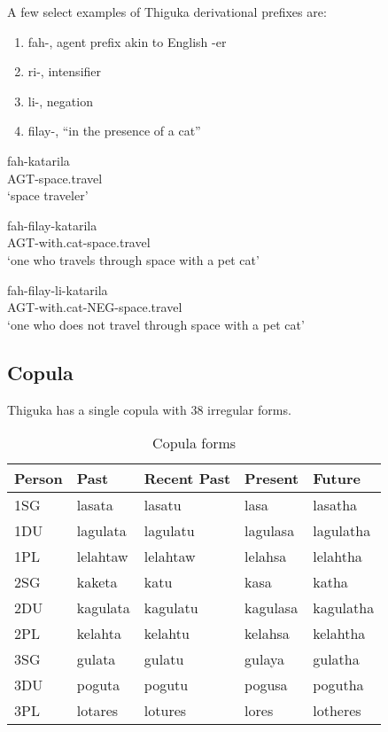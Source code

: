 A few select examples of Thiguka derivational prefixes are:

\begin{enumerate}
    \item fah-, agent prefix akin to English -er
    \item ri-, intensifier
    \item li-, negation
    \item filay-, ``in the presence of a cat''
\end{enumerate}

\begin{exe}
    \ex{} \gll{}fah-katarila\\
    AGT-space.travel\\
    \glt{}`space traveler'
\end{exe}

\begin{exe}
    \ex{} \gll{}fah-filay-katarila\\
    AGT-with.cat-space.travel\\
    \glt{}`one who travels through space with a pet cat'
\end{exe}

\begin{exe}
    \ex{} \gll{}fah-filay-li-katarila\\
    AGT-with.cat-NEG-space.travel\\
    \glt{}`one who does not travel through space with a pet cat'
\end{exe}

\subsection{Copula}
Thiguka has a single copula with 38 irregular forms.

\begin{table}[h!]
    \centering
    \caption{Copula forms}
    \begin{tabularx}{15cm}{|X|X|X|X|X|}
        \hline
        Person & \textbf{Past} & \textbf{Recent Past} & \textbf{Present} & \textbf{Future} \\
        \hline
        1SG & lasata & lasatu & lasa & lasatha \\
        1DU & lagulata & lagulatu & lagulasa & lagulatha \\
        1PL & lelahtaw & lelahtaw & lelahsa & lelahtha \\
        2SG & kaketa & katu & kasa & katha \\
        2DU & kagulata & kagulatu & kagulasa & kagulatha \\
        2PL & kelahta & kelahtu & kelahsa & kelahtha \\
        3SG & gulata & gulatu & gulaya & gulatha \\
        3DU & poguta & pogutu & pogusa & pogutha \\
        3PL & lotares & lotures & lores & lotheres \\
        \hline
    \end{tabularx}
\end{table}



